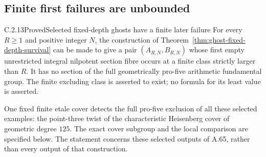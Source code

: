 \subsection{Finite first failures are unbounded}

\begin{result}{C.2.13}{Proved}{Selected fixed-depth ghosts have a finite later failure}
\label{thm:ghost-unbounded-finite-failures}
For every \(R\ge1\) and positive integer \(N\),
the construction of Theorem~\ref{thm:ghost-fixed-depth-survival}
can be made to give a pair \((A_{R,N},B_{R,N})\)
whose first empty unrestricted integral nilpotent
section fibre occurs at a finite class strictly
larger than \(R\). It has no section of the full
geometrically pro-five arithmetic fundamental group.
The finite excluding class is asserted to exist;
no formula for its least value is asserted.

One fixed finite etale cover detects the full
pro-five exclusion of all these selected examples:
the point-three twist of the characteristic
Heisenberg cover of geometric degree \(125\).
The exact cover subgroup and the local comparison
are specified below. The statement concerns these
selected outputs of A.65, rather than every output
of that construction.
\end{result}
